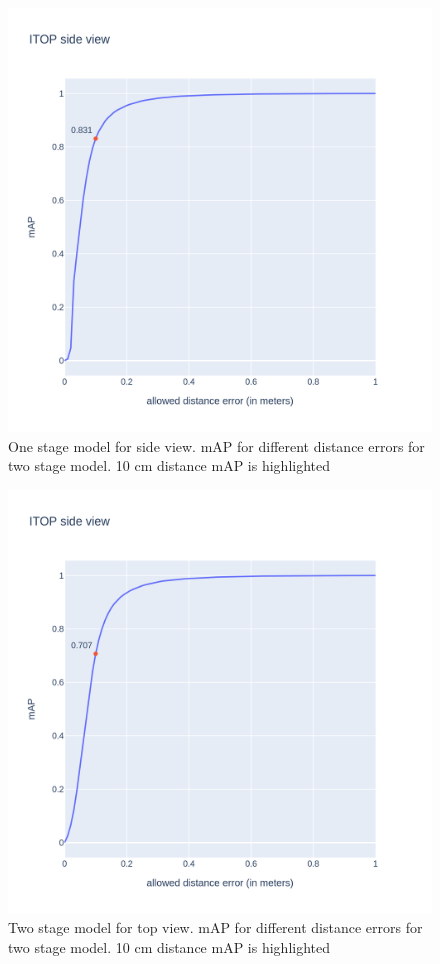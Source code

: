 \begin{figure}[htbp]
    \centerline{\includegraphics[trim=50 100 50 100,clip,scale=0.15]{Figures/one-stage-map.png}}
    \caption{One stage model for side view. mAP for different distance errors for two stage model. 10 cm distance mAP is highlighted}
    \label{img:one-stage-map}
\end{figure}


\begin{figure}[htbp]
    \centerline{\includegraphics[trim=50 100 50 100,clip,scale=0.15]{Figures/two-stage-map-top-view.png}}
    \caption{Two stage model for top view. mAP for different distance errors for two stage model. 10 cm distance mAP is highlighted}
    \label{img:two-stage-map-side-view}
\end{figure}


